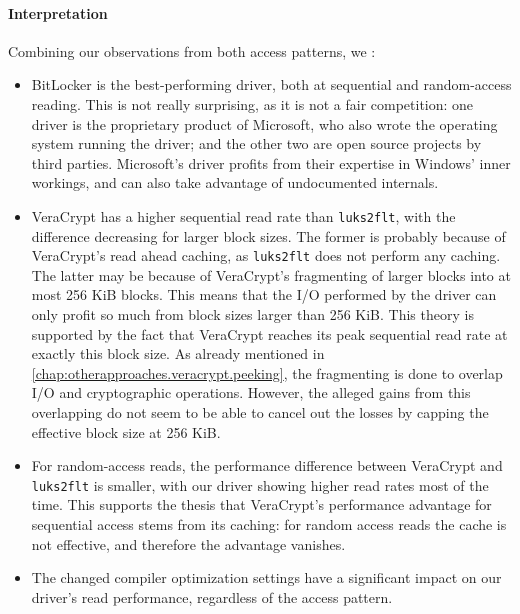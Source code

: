 \paragraph{Interpretation}
Combining our observations from both access patterns, we : 
\begin{itemize}
	\item BitLocker is the best-performing driver, both at sequential and random-access reading. This is not really surprising, as it is not a fair competition: one driver is the proprietary product of Microsoft, who also wrote the operating system running the driver; and the other two are open source projects by third parties. Microsoft's driver profits from their expertise in Windows' inner workings, and can also take advantage of undocumented internals.
	\item VeraCrypt has a higher sequential read rate than \texttt{luks2flt}, with the difference decreasing for larger block sizes. The former is probably because of VeraCrypt's read ahead caching, as \texttt{luks2flt} does not perform any caching. The latter may be because of VeraCrypt's fragmenting of larger blocks into at most 256 KiB blocks. This means that the I/O performed by the driver can only profit so much from block sizes larger than 256 KiB. This theory is supported by the fact that VeraCrypt reaches its peak sequential read rate at exactly this block size. As already mentioned in \autoref{chap:otherapproaches.veracrypt.peeking}, the fragmenting is done to overlap I/O and cryptographic operations. However, the alleged gains from this overlapping do not seem to be able to cancel out the losses by capping the effective block size at 256 KiB.
	\item For random-access reads, the performance difference between VeraCrypt and \texttt{luks2flt} is smaller, with our driver showing higher read rates most of the time. This supports the thesis that VeraCrypt's performance advantage for sequential access stems from its caching: for random access reads the cache is not effective, and therefore the advantage vanishes.
	\item The changed compiler optimization settings have a significant impact on our driver's read performance, regardless of the access pattern.
\end{itemize}

